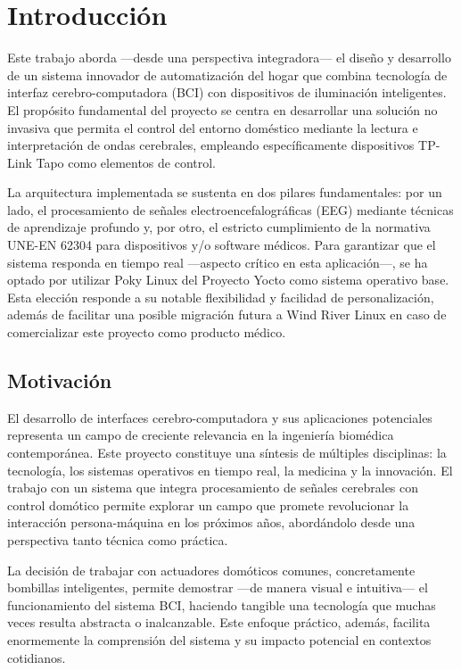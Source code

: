 \chapter{Introducción}

Este trabajo aborda —desde una perspectiva integradora— el diseño y desarrollo de un sistema innovador de automatización del hogar que combina tecnología de interfaz cerebro-computadora (BCI) con dispositivos de iluminación inteligentes. El propósito fundamental del proyecto se centra en desarrollar una solución no invasiva que permita el control del entorno doméstico mediante la lectura e interpretación de ondas cerebrales, empleando específicamente dispositivos TP-Link Tapo como elementos de control.

La arquitectura implementada se sustenta en dos pilares fundamentales: por un lado, el procesamiento de señales electroencefalográficas (EEG) mediante técnicas de aprendizaje profundo y, por otro, el estricto cumplimiento de la normativa UNE-EN 62304 para dispositivos y/o software médicos. Para garantizar que el sistema responda en tiempo real —aspecto crítico en esta aplicación—, se ha optado por utilizar Poky Linux del Proyecto Yocto como sistema operativo base. Esta elección responde a su notable flexibilidad y facilidad de personalización, además de facilitar una posible migración futura a Wind River Linux en caso de comercializar este proyecto como producto médico.

\section{Motivación}
El desarrollo de interfaces cerebro-computadora y sus aplicaciones potenciales representa un campo de creciente relevancia en la ingeniería biomédica contemporánea. Este proyecto constituye una síntesis de múltiples disciplinas: la tecnología, los sistemas operativos en tiempo real, la medicina y la innovación. El trabajo con un sistema que integra procesamiento de señales cerebrales con control domótico permite explorar un campo que promete revolucionar la interacción persona-máquina en los próximos años, abordándolo desde una perspectiva tanto técnica como práctica.

La decisión de trabajar con actuadores domóticos comunes, concretamente bombillas inteligentes, permite demostrar —de manera visual e intuitiva— el funcionamiento del sistema BCI, haciendo tangible una tecnología que muchas veces resulta abstracta o inalcanzable. Este enfoque práctico, además, facilita enormemente la comprensión del sistema y su impacto potencial en contextos cotidianos.

